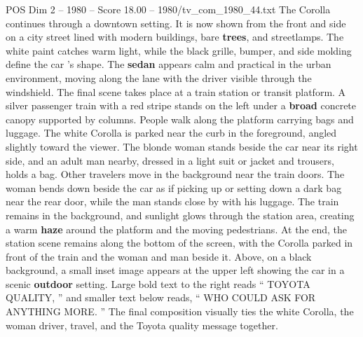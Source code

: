 \begin{textsample}{POS Dim 2 – 1980 – Score 18.00 – 1980/tv\_com\_1980\_44.txt}
The Corolla continues through a downtown setting.
It is now shown from the front and side on a city street lined with modern buildings, bare \textbf{trees}, and streetlamps.
The white paint catches warm light, while the black grille, bumper, and side molding define the car ’s shape.
The \textbf{sedan} appears calm and practical in the urban environment, moving along the lane with the driver visible through the windshield.
The final scene takes place at a train station or transit platform.
A silver passenger train with a red stripe stands on the left under a \textbf{broad} concrete canopy supported by columns.
People walk along the platform carrying bags and luggage.
The white Corolla is parked near the curb in the foreground, angled slightly toward the viewer.
The blonde woman stands beside the car near its right side, and an adult man nearby, dressed in a light suit or jacket and trousers, holds a bag.
Other travelers move in the background near the train doors.
The woman bends down beside the car as if picking up or setting down a dark bag near the rear door, while the man stands close by with his luggage.
The train remains in the background, and sunlight glows through the station area, creating a warm \textbf{haze} around the platform and the moving pedestrians.
At the end, the station scene remains along the bottom of the screen, with the Corolla parked in front of the train and the woman and man beside it.
Above, on a black background, a small inset image appears at the upper left showing the car in a scenic \textbf{outdoor} setting.
Large bold text to the right reads “ TOYOTA QUALITY, ” and smaller text below reads, “ WHO COULD ASK FOR ANYTHING MORE. ” The final composition visually ties the white Corolla, the woman driver, travel, and the Toyota quality message together.

\end{textsample}
